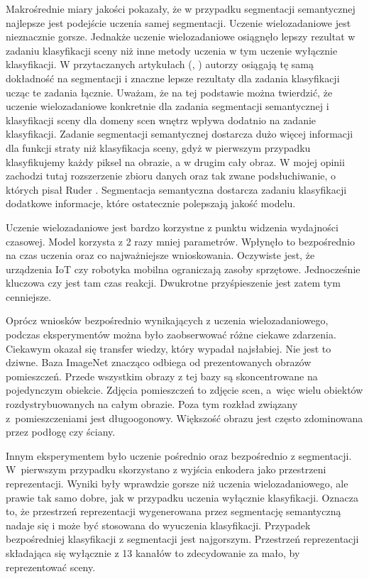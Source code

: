 Makrośrednie miary jakości pokazały, że w przypadku segmentacji semantycznej najlepsze jest podejście uczenia samej segmentacji. Uczenie wielozadaniowe jest nieznacznie gorsze. Jednakże uczenie wielozadaniowe osiągnęło lepszy rezultat w zadaniu klasyfikacji sceny niż inne metody uczenia w tym uczenie wyłącznie klasyfikacji. W przytaczanych artykułach (\cite{mehta2018net}, \cite{9892852}) autorzy osiągają tę samą dokładność na segmentacji i znaczne lepsze rezultaty dla zadania klasyfikacji ucząc te zadania łącznie. Uważam, że na tej podstawie można twierdzić, że uczenie wielozadaniowe konkretnie dla zadania segmentacji semantycznej i klasyfikacji sceny dla domeny scen wnętrz wpływa dodatnio na zadanie klasyfikacji. Zadanie segmentacji semantycznej dostarcza dużo więcej informacji dla funkcji straty niż klasyfikacja sceny, gdyż w pierwszym przypadku klasyfikujemy każdy piksel na obrazie, a w drugim cały obraz. W mojej opinii zachodzi tutaj rozszerzenie zbioru danych oraz tak zwane podsłuchiwanie, o których pisał Ruder \cite{ruder2017overview}. Segmentacja semantyczna dostarcza zadaniu klasyfikacji dodatkowe informacje, które ostatecznie polepszają jakość modelu.

Uczenie wielozadaniowe jest bardzo korzystne z punktu widzenia wydajności czasowej. Model korzysta z 2 razy mniej parametrów. Wpłynęło to bezpośrednio na czas uczenia oraz co najważniejsze wnioskowania. Oczywiste jest, że urządzenia IoT czy robotyka mobilna ograniczają zasoby sprzętowe. Jednocześnie kluczowa czy jest tam czas reakcji. Dwukrotne przyśpieszenie jest zatem tym cenniejsze.

Oprócz wniosków bezpośrednio wynikających z uczenia wielozadaniowego, podczas eksperymentów można było zaobserwować różne ciekawe zdarzenia. Ciekawym okazał się transfer wiedzy, który wypadał najsłabiej. Nie jest to dziwne. Baza ImageNet znacząco odbiega od prezentowanych obrazów pomieszczeń. Przede wszystkim obrazy z tej bazy są skoncentrowane na pojedynczym obiekcie. Zdjęcia pomieszczeń to zdjęcie scen, a~więc wielu obiektów rozdystrybuowanych na całym obrazie. Poza tym rozkład związany z~pomieszczeniami jest długoogonowy. Większość obrazu jest często zdominowana przez podłogę czy ściany.

Innym eksperymentem było uczenie pośrednio oraz bezpośrednio z segmentacji. W~pierwszym przypadku skorzystano z wyjścia enkodera jako przestrzeni reprezentacji. Wyniki były wprawdzie gorsze niż uczenia wielozadaniowego, ale prawie tak samo dobre, jak w przypadku uczenia wyłącznie klasyfikacji. Oznacza to, że przestrzeń reprezentacji wygenerowana przez segmentację semantyczną nadaje się i może być stosowana do wyuczenia klasyfikacji. Przypadek bezpośredniej klasyfikacji z segmentacji jest najgorszym. Przestrzeń reprezentacji składająca się wyłącznie z 13 kanałów to zdecydowanie za mało, by reprezentować sceny.

